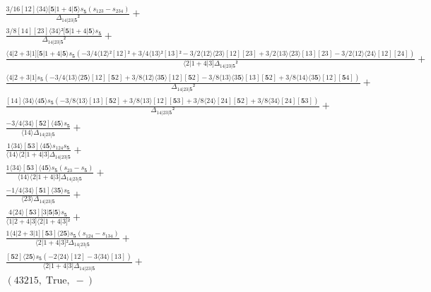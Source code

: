 \documentclass[varwidth, border=5pt]{standalone}
\begin{document}
\begin{my}
$\begin{gathered}
\scriptscriptstyle\frac{3/16[12]⟨34⟩[𝟓|1+4|𝟓⟩s_{𝟓}(s_{123}-s_{234})}{Δ_{14|23|𝟓}²} +\\
\scriptscriptstyle\frac{3/8[14][23]⟨34⟩²[𝟓|1+4|𝟓⟩s_{𝟓}}{Δ_{14|23|𝟓}²} +\\
\scriptscriptstyle\frac{⟨4|2+3|1][𝟓|1+4|𝟓⟩s_{𝟓}(-3/4⟨12⟩²[12]²+3/4⟨13⟩²[13]²-3/2⟨12⟩⟨23⟩[12][23]+3/2⟨13⟩⟨23⟩[13][23]-3/2⟨12⟩⟨24⟩[12][24])}{⟨2|1+4|3]Δ_{14|23|𝟓}²} +\\
\scriptscriptstyle\frac{⟨4|2+3|1]s_{𝟓}(-3/4⟨13⟩⟨2𝟓⟩[12][𝟓2]+3/8⟨12⟩⟨3𝟓⟩[12][𝟓2]-3/8⟨13⟩⟨3𝟓⟩[13][𝟓2]+3/8⟨14⟩⟨3𝟓⟩[12][𝟓4])}{Δ_{14|23|𝟓}²} +\\
\scriptscriptstyle\frac{[14]⟨34⟩⟨4𝟓⟩s_{𝟓}(-3/8⟨13⟩[13][𝟓2]+3/8⟨13⟩[12][𝟓3]+3/8⟨24⟩[24][𝟓2]+3/8⟨34⟩[24][𝟓3])}{Δ_{14|23|𝟓}²} +\\
\scriptscriptstyle\frac{-3/4⟨34⟩[𝟓2]⟨4𝟓⟩s_{𝟓}}{⟨14⟩Δ_{14|23|𝟓}} +\\
\scriptscriptstyle\frac{1⟨34⟩[𝟓3]⟨4𝟓⟩s_{124}s_{𝟓}}{⟨14⟩⟨2|1+4|3]Δ_{14|23|𝟓}} +\\
\scriptscriptstyle\frac{1⟨34⟩[𝟓3]⟨4𝟓⟩s_{𝟓}(s_{23}-s_{𝟓})}{⟨14⟩⟨2|1+4|3]Δ_{14|23|𝟓}} +\\
\scriptscriptstyle\frac{-1/4⟨34⟩[𝟓1]⟨3𝟓⟩s_{𝟓}}{⟨23⟩Δ_{14|23|𝟓}} +\\
\scriptscriptstyle\frac{4⟨24⟩[𝟓3][3|𝟓|𝟓⟩s_{𝟓}}{⟨1|2+4|3]⟨2|1+4|3]²} +\\
\scriptscriptstyle\frac{1⟨4|2+3|1][𝟓3]⟨2𝟓⟩s_{𝟓}(s_{124}-s_{134})}{⟨2|1+4|3]²Δ_{14|23|𝟓}} +\\
\scriptscriptstyle\frac{[𝟓2]⟨2𝟓⟩s_{𝟓}(-2⟨24⟩[12]-3⟨34⟩[13])}{⟨2|1+4|3]Δ_{14|23|𝟓}} +\\
\scriptscriptstyle(43215,\;\text{True},\;-) \phantom{+}
\end{gathered}$
\end{my}
\end{document}

